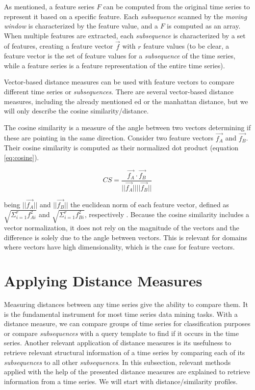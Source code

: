 As mentioned, a feature series $F$ can be computed from the original time series to represent it based on a specific feature.  Each \textit{subsequence} scanned by the \textit{moving window} is characterized by the feature value, and a $F$ is computed as an array. When multiple features are extracted, each \textit{subsequence} is characterized by a set of features, creating a feature vector $\vec{f}$ with $r$ feature values (to be clear, a feature vector is the set of feature values for a \textit{subsequence} of the time series, while a feature series is a feature representation of the entire time series). 
\par
Vector-based distance measures can be used with feature vectors to compare different time series or \textit{subsequences}. There are several vector-based distance measures, including the already mentioned \gls{ed} or the manhattan distance, but we will only describe the cosine similarity/distance.
\par
The cosine similarity is a measure of the angle between two vectors determining if these are pointing in the same direction. Consider two feature vectors $\vec{f_A}$ and $\vec{f_B}$. Their cosine similarity is computed as their normalized dot product \cite{cosine} (equation \ref{eq:cosine}).

\begin{equation}
\label{eq:cosine}
CS = \frac{\vec{f_A} \cdot \vec{f_B}}{||\vec{f_A}|| ||\vec{f_B}||}
\end{equation}

being $||\vec{f_A}||$ and $||\vec{f_B}||$ the euclidean norm of each feature vector, defined as $\sqrt{\Sigma_{i=1}^{r} f_{Ai}^2}$ and $\sqrt{\Sigma_{i=1}^{r} f_{Bi}^2}$, respectively \cite{cosine}. Because the cosine similarity includes a vector normalization, it does not rely on the magnitude of the vectors and the difference is solely due to the angle between vectors. This is relevant for domains where vectors have high dimensionality, which is the case for feature vectors.


\section{Applying Distance Measures}
\label{sec:dist_measures}

Measuring distances between any time series give the ability to compare them. It is the fundamental instrument for most time series data mining tasks. With a distance measure, we can compare groups of time series for classification purposes or compare \textit{subsequences} with a query template to find if it occurs in the time series. Another relevant application of distance measures is its usefulness to retrieve relevant structural information of a time series by comparing each of its \textit{subsequences} to all other \textit{subsequences}. In this subsection, relevant methods applied with the help of the presented distance measures are explained to retrieve information from a time series. We will start with distance/similarity profiles.

